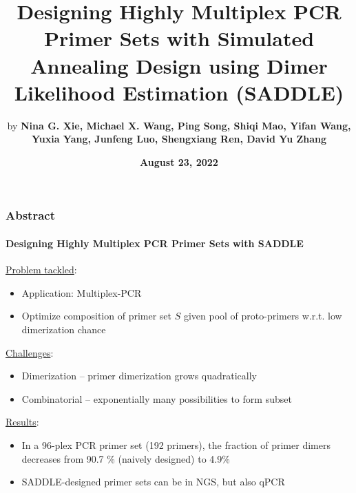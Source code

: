 \documentclass[xcolor=dvipsnames,envcountsect]{beamer}
\title[Designing Highly Multiplex PCR Primer Sets with SADDLE]{Designing Highly Multiplex PCR Primer Sets with Simulated Annealing Design using Dimer Likelihood Estimation (SADDLE)}
\author [Xie et al. - SADDLE]{by \textbf{Nina G. Xie,  Michael X. Wang, Ping Song, Shiqi Mao, Yifan Wang, Yuxia Yang, Junfeng Luo, Shengxiang Ren, David Yu Zhang}}
\institute[Free University Berlin] {\emph{Presenter: }\textbf{Marie Hoffmann, M.Sc.}\\[1em]
	published 2022/04/11 in Nature Communications, Volume 13, Issue 1\\[1em]
}
\date[August 21, 2022]{\footnotesize\textbf{August 23, 2022}}
\begin{document}
	
\begin{frame}{\titlepage}\end{frame}
\begin{frame}\frametitle{Abstract}\framesubtitle{Designing Highly Multiplex PCR Primer Sets with SADDLE}
\underline{Problem tackled}:
    \begin{itemize}
        \item Application: Multiplex-PCR
        \item Optimize composition of primer set $S$ given pool of proto-primers w.r.t. low dimerization chance %
    \end{itemize}
\underline{Challenges}:
    \begin{itemize}
        \item Dimerization -- primer dimerization grows quadratically %
        \item Combinatorial -- exponentially many possibilities to form subset 
    \end{itemize}
\underline{Results}:
    \begin{itemize}
        \item In a 96-plex PCR primer set (192 primers), the fraction of primer dimers decreases from 90.7 \% (naively designed) to 4.9\% %
        \item SADDLE-designed primer sets can be in NGS, but also qPCR
    \end{itemize}


\end{frame}
\end{document}
